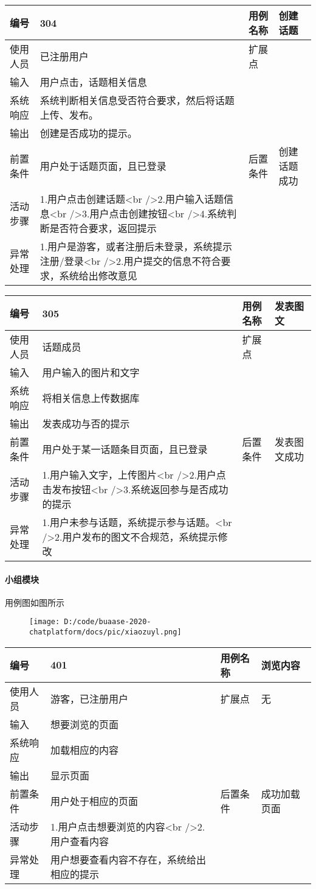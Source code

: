 \documentclass[
]{article}
\begin{document}
\begin{longtable}[]{@{}llll@{}}
\toprule
编号 & 304 & 用例名称 & 创建话题\tabularnewline
\midrule
\endhead
使用人员 & 已注册用户 & 扩展点 &\tabularnewline
输入 & 用户点击，话题相关信息 & &\tabularnewline
系统响应 & 系统判断相关信息受否符合要求，然后将话题上传、发布。 &
&\tabularnewline
输出 & 创建是否成功的提示。 & &\tabularnewline
前置条件 & 用户处于话题页面，且已登录 & 后置条件 &
创建话题成功\tabularnewline
活动步骤 & 1.用户点击创建话题\textless br
/\textgreater{}2.用户输入话题信息\textless br
/\textgreater{}3.用户点击创建按钮\textless br
/\textgreater{}4.系统判断是否符合要求，返回提示 & &\tabularnewline
异常处理 & 1.用户是游客，或者注册后未登录，系统提示注册/登录\textless br
/\textgreater{}2.用户提交的信息不符合要求，系统给出修改意见 &
&\tabularnewline
\bottomrule
\end{longtable}

\begin{longtable}[]{@{}llll@{}}
\toprule
编号 & 305 & 用例名称 & 发表图文\tabularnewline
\midrule
\endhead
使用人员 & 话题成员 & 扩展点 &\tabularnewline
输入 & 用户输入的图片和文字 & &\tabularnewline
系统响应 & 将相关信息上传数据库 & &\tabularnewline
输出 & 发表成功与否的提示 & &\tabularnewline
前置条件 & 用户处于某一话题条目页面，且已登录 & 后置条件 &
发表图文成功\tabularnewline
活动步骤 & 1.用户输入文字，上传图片\textless br
/\textgreater{}2.用户点击发布按钮\textless br
/\textgreater{}3.系统返回参与是否成功的提示 & &\tabularnewline
异常处理 & 1.用户未参与话题，系统提示参与话题。\textless br
/\textgreater{}2.用户发布的图文不合规范，系统提示修改 & &\tabularnewline
\bottomrule
\end{longtable}

\hypertarget{header-n857}{%
\paragraph{小组模块}\label{header-n857}}

用例图如图所示

\begin{figure}
\centering
\texttt{[image: D:/code/buaase-2020-chatplatform/docs/pic/xiaozuyl.png]}
\caption{}
\end{figure}

\begin{longtable}[]{@{}llll@{}}
\toprule
编号 & 401 & 用例名称 & 浏览内容\tabularnewline
\midrule
\endhead
使用人员 & 游客，已注册用户 & 扩展点 & 无\tabularnewline
输入 & 想要浏览的页面 & &\tabularnewline
系统响应 & 加载相应的内容 & &\tabularnewline
输出 & 显示页面 & &\tabularnewline
前置条件 & 用户处于相应的页面 & 后置条件 & 成功加载页面\tabularnewline
活动步骤 & 1.用户点击想要浏览的内容\textless br
/\textgreater{}2.用户查看内容 & &\tabularnewline
异常处理 & 用户想要查看内容不存在，系统给出相应的提示 & &\tabularnewline
\bottomrule
\end{longtable}
\end{document}
